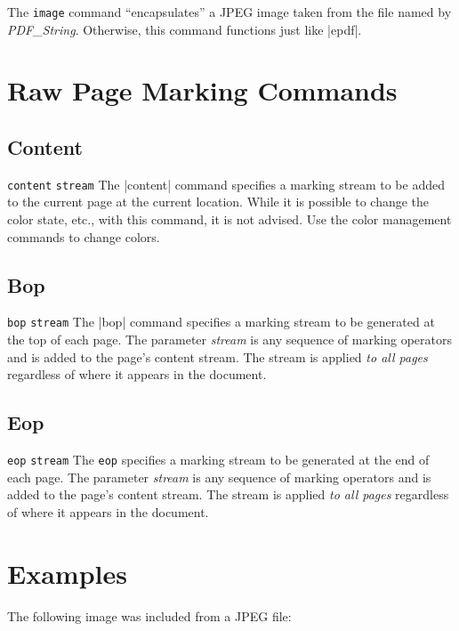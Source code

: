 {\description
The {\tt image} command ``encapsulates'' a JPEG image
taken from the file named by {\it PDF\_String}.
Otherwise, this command functions just like |epdf|.

\section{Raw Page Marking Commands}

\subsection{Content}
\syntax
{\tt content} {\tt stream}
\description
The |content| command specifies a marking
stream to be added to the current page at
the current location.  While it
is possible to change the color
state, etc., with this command, it is
not advised.  Use the color management
commands to change colors.

\subsection{Bop}
\syntax
{\tt bop} {\tt stream}
\description
The |bop| command specifies a marking
stream to be generated at the top of each page.
The parameter {\it stream} is any sequence
of marking operators and is added to the page's content stream.  
The stream is applied {\it to all pages} regardless
of where it appears in the document.
\example
\begintt
{}
\endtt
{}


\subsection{Eop}
\beginlist
{\tt eop} {\tt stream}
\endlist
The {\tt eop} specifies a marking stream to be generated at the end
of each page. The parameter {\it stream} is any sequence
of marking operators and is added to the page's content stream.  
The stream is applied {\it to all pages} regardless
of where it appears in the document.

\section{Examples}
The following image was included from a JPEG file:

}
